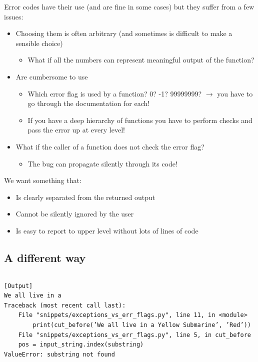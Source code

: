     Error codes have their use (and are fine in some cases) but they suffer from a few issues:
    \begin{itemize}
      \item Choosing them is often arbitrary (and sometimes is difficult to make a sensible choice)
      \begin{itemize}
        \item What if all the numbers can represent meaningful output of the function?
      \end{itemize}
      \item Are cumbersome to use
      \begin{itemize}
        \item Which error flag is used by a function? 0? -1? 99999999? $\rightarrow$ you have to go through the documentation for each!
        \item If you have a deep hierarchy of functions you have to perform checks and pass the error up at every level!
      \end{itemize}
      \item What if the caller of a function does not check the error flag?
      \begin{itemize}
        \item The bug can propagate \alert{silently} through its code!
      \end{itemize}
    \end{itemize}
    \medskip
    We want something that:
    \begin{itemize}
      \item Is clearly separated from the returned output
      \item Cannot be silently ignored by the user
      \item Is easy to report to upper level without lots of lines of code
    \end{itemize}  

\subsection{A different way}

\inputminted{python}{snippets/exceptions_vs_err_flags.py}
\begin{verbatim}
[Output]
We all live in a
Traceback (most recent call last):
    File "snippets/exceptions_vs_err_flags.py", line 11, in <module>
        print(cut_before(’We all live in a Yellow Submarine’, ’Red’))
    File "snippets/exceptions_vs_err_flags.py", line 5, in cut_before
    pos = input_string.index(substring)
ValueError: substring not found
\end{verbatim}

